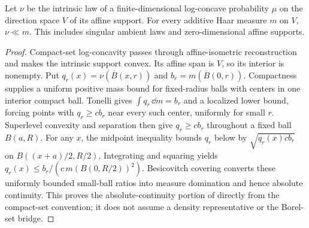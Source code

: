 \begin{lemma}
  \label{lem:logconcave-intrinsic-absolute-continuity}
  \leanok
  Let $\nu$ be the intrinsic law of a finite-dimensional log-concave probability $\mu$ on the
  direction space $V$ of its affine support. For every additive Haar measure $m$ on $V$,
  $\nu\ll m$. This includes singular ambient laws and zero-dimensional affine supports.
\end{lemma}
\begin{proof}
  \leanok
  Compact-set log-concavity passes through affine-isometric reconstruction and makes the
  intrinsic support convex. Its affine span is $V$, so its interior is nonempty. Put
  $q_r(x)=\nu(\overline B(x,r))$ and $b_r=m(\overline B(0,r))$.
  Compactness supplies a uniform positive mass bound for fixed-radius balls with centers
  in one interior compact ball. Tonelli gives $\int q_r\,\dd m=b_r$ and a localized lower
  bound, forcing points with $q_r\ge c b_r$ near every such center, uniformly for small $r$.
  Superlevel convexity and separation then give $q_r\ge c b_r$ throughout a fixed ball
  $B(a,R)$. For any $x$, the midpoint inequality bounds $q_r$ below by
  $\sqrt{q_r(x)c b_r}$ on $B((x+a)/2,R/2)$. Integrating and squaring yields
  $q_r(x)\le b_r/(c\,m(B(0,R/2))^2)$. Besicovitch covering converts these uniformly
  bounded small-ball ratios into measure domination and hence absolute continuity.
  This proves the absolute-continuity portion of \cite{Borell1974Convex} directly from the
  compact-set convention; it does not assume a density representative or the Borel-set bridge.
\end{proof}

